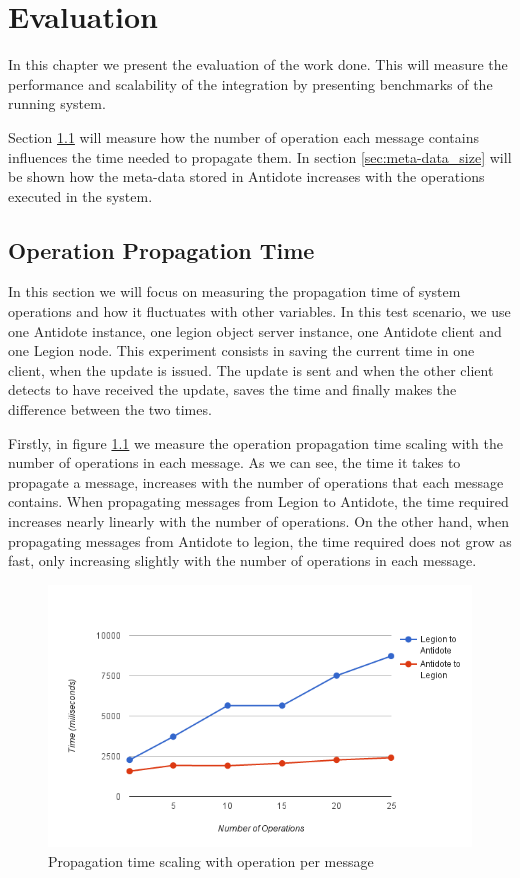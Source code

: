 \chapter{Evaluation}
\label{cha:evaluation}
In this chapter we present the evaluation of the work done. This will measure the performance and scalability of the integration by presenting benchmarks of the running system.\par
	Section \ref{sec:operation_propagation_time} will measure how the number of operation each message contains influences the time needed to propagate them. In section \ref{sec:meta-data_size} will be shown how the meta-data stored in Antidote increases with the operations executed in the system.

\section{Operation Propagation Time}
\label{sec:operation_propagation_time}
In this section we will focus on measuring the propagation time of system operations and how it fluctuates with other variables. In this test scenario, we use one Antidote instance, one legion object server instance, one Antidote client and one Legion node. This experiment consists in saving the current time in one client, when the update is issued. The update is sent and when the other client detects to have received the update, saves the time and finally makes the difference between the two times.\par
	Firstly, in figure \ref{graph1} we measure the operation propagation time scaling with the number of operations in each message. As we can see, the time it takes to propagate a message, increases with the number of operations that each message contains. When propagating messages from Legion to Antidote, the time required increases nearly linearly with the number of operations. On the other hand, when propagating messages from Antidote to legion, the time required does not grow as fast, only increasing slightly with the number of operations in each message.

\begin{figure}[H]
\centering
\includegraphics[scale=0.7]{files/graph1.png}
\caption{Propagation time scaling with operation per message}
\label{graph1}
\end{figure}

